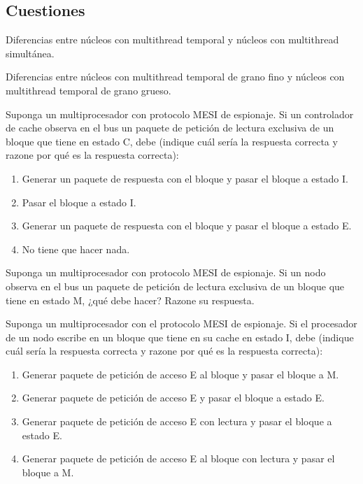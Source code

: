 \subsection{Cuestiones}

\begin{cuestion}
    Diferencias entre núcleos con multithread temporal y núcleos con multithread simultánea.
\end{cuestion}

\begin{cuestion}
    Diferencias entre núcleos con multithread temporal de grano fino y núcleos con multithread
    temporal de grano grueso.
\end{cuestion}

\begin{cuestion}
    Suponga un multiprocesador con protocolo MESI de espionaje. Si un controlador de cache
    observa en el bus un paquete de petición de lectura exclusiva de un bloque que tiene en estado C, debe
    (indique cuál sería la respuesta correcta y razone por qué es la respuesta correcta):
    \begin{enumerate}
        \item Generar un paquete de respuesta con el bloque y pasar el bloque a estado I.
        \item Pasar el bloque a estado I.
        \item Generar un paquete de respuesta con el bloque y pasar el bloque a estado E.
        \item No tiene que hacer nada.
    \end{enumerate}
\end{cuestion}

\begin{cuestion}
    Suponga un multiprocesador con protocolo MESI de espionaje. Si un nodo observa en el bus un
    paquete de petición de lectura exclusiva de un bloque que tiene en estado M, ¿qué debe hacer? Razone su
    respuesta.
\end{cuestion}

\begin{cuestion}
    Suponga un multiprocesador con el protocolo MESI de espionaje. Si el procesador de un nodo
    escribe en un bloque que tiene en su cache en estado I, debe (indique cuál sería la respuesta correcta y
    razone por qué es la respuesta correcta):
    \begin{enumerate}
        \item Generar paquete de petición de acceso E al bloque y pasar el bloque a M.
        \item Generar paquete de petición de acceso E y pasar el bloque a estado E.
        \item Generar paquete de petición de acceso E con lectura y pasar el bloque a estado E.
        \item Generar paquete de petición de acceso E al bloque con lectura y pasar el bloque a M.
    \end{enumerate}
\end{cuestion}

